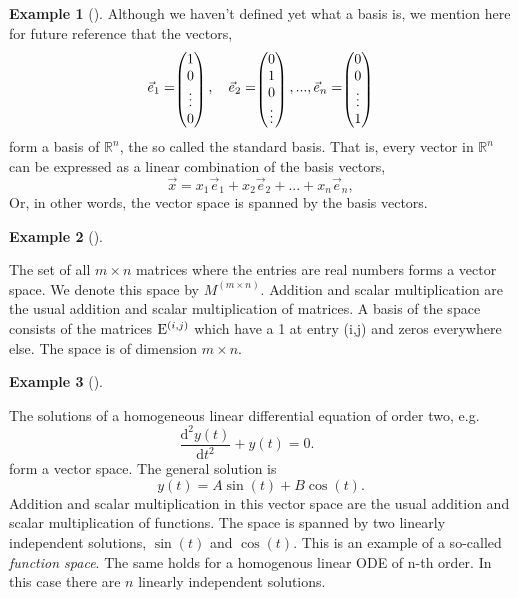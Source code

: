 \documentclass[
  a4paper,
  DIV=11,
  numbers=noendperiod,
  oneside]{scrreprt}
\theoremstyle{definition}
\newtheorem{example}{Example}[chapter]
\theoremstyle{remark}
\begin{document}
\begin{example}[]
Although we haven't defined yet what a basis is, we mention here for
future reference that the vectors,
\[\vec{e}_{1} =  \scriptscriptstyle \begin{pmatrix}   1\\ 0 \\ \vdots \\ 0   \end{pmatrix} \textstyle, \quad  \vec{e}_{2} =  \scriptscriptstyle \begin{pmatrix}   0\\ 1 \\ 0 \\ \vdots  \end{pmatrix} \textstyle, ...    ,\vec{e}_{n} =  \scriptscriptstyle \begin{pmatrix}   0\\ 0 \\ \vdots \\ 1   \end{pmatrix} \textstyle\]
form a basis of \(\mathbb{R}^{n}\), the so called the standard basis.
That is, every vector in \(\mathbb{R}^{n}\) can be expressed as a linear
combination of the basis vectors,
\[\vec{x} = x_{1} \vec{e}_{1} + x_{2} \vec{e}_{2} + ... + x_{n} \vec{e}_{n} ,\]
Or, in other words, the vector space is spanned by the basis vectors.

\end{example}

\begin{example}[]\protect\hypertarget{exm-vktspace5}{}\label{exm-vktspace5}

The set of all \(m\times n\) matrices where the entries are real numbers
forms a vector space. We denote this space by \(M^{(m \times n)}\).
Addition and scalar multiplication are the usual addition and scalar
multiplication of matrices. A basis of the space consists of the
matrices \({\rm E}^{(i,j)}\) which have a 1 at entry (i,j) and zeros
everywhere else. The space is of dimension \(m \times n\).

\end{example}

\begin{example}[]\protect\hypertarget{exm-vktspace7}{}\label{exm-vktspace7}

The solutions of a homogeneous linear differential equation of order
two, e.g. \[\frac{\mathrm{d}^{2}y(t)}{\mathrm{d}t^{2}}+y(t)=0.\qquad\]
form a vector space. The general solution is
\[ y(t) = A \sin(t) + B \cos(t). \] Addition and scalar multiplication
in this vector space are the usual addition and scalar multiplication of
functions. The space is spanned by two linearly independent solutions,
\(\sin(t)\) and \(\cos(t)\). This is an example of a so-called
\emph{function space}. The same holds for a homogenous linear ODE of
n-th order. In this case there are \(n\) linearly independent solutions.

\end{example}
\end{document}
